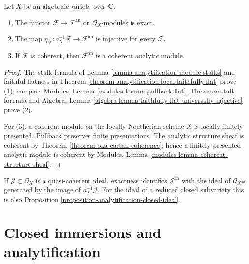 \begin{lemma}
\label{lemma-analytification-exact-faithful-coherent}
\begin{reference}
\cite[\S 3, no. 9, Proposition 10]{GAGA}
\end{reference}
Let $X$ be an algebraic variety over $\mathbf C$.
\begin{enumerate}
\item The functor $\mathcal F\mapsto\mathcal F^{\mathrm{an}}$ on
$\mathcal O_X$-modules is exact.
\item The map $\eta_{\mathcal F}:a_X^{-1}\mathcal F\to
\mathcal F^{\mathrm{an}}$ is injective for every $\mathcal F$.
\item If $\mathcal F$ is coherent, then $\mathcal F^{\mathrm{an}}$ is a
coherent analytic module.
\end{enumerate}
\end{lemma}

\begin{proof}
The stalk formula of Lemma \ref{lemma-analytification-module-stalks} and
faithful flatness in Theorem
\ref{theorem-analytification-local-faithfully-flat} prove (1); compare
Modules, Lemma \ref{modules-lemma-pullback-flat}. The same stalk formula and
Algebra, Lemma
\ref{algebra-lemma-faithfully-flat-universally-injective} prove (2).

For (3), a coherent module on the locally Noetherian scheme $X$ is locally
finitely presented. Pullback preserves finite presentations. The analytic
structure sheaf is coherent by Theorem
\ref{theorem-oka-cartan-coherence}; hence a finitely presented analytic
module is coherent by Modules, Lemma
\ref{modules-lemma-coherent-structure-sheaf}.
\end{proof}

\begin{remark}
\label{remark-analytification-ideal-sheaf}
If $\mathcal J\subset\mathcal O_X$ is a quasi-coherent ideal, exactness
identifies $\mathcal J^{\mathrm{an}}$ with the ideal of
$\mathcal O_{X^{\mathrm{an}}}$ generated by the image of
$a_X^{-1}\mathcal J$. For the ideal of a reduced closed subvariety this is
also Proposition \ref{proposition-analytification-closed-ideal}.
\end{remark}


\section{Closed immersions and analytification}
\label{section-analytification-closed-immersions}

